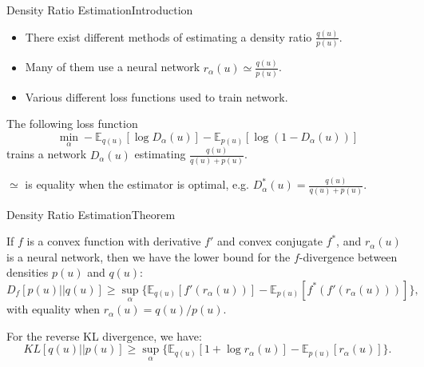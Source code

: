 \documentclass[handout]{beamer}
\newcommand{\E}{\mathbb{E}}
\begin{document}
\begin{frame}{Density Ratio Estimation}{Introduction}
\begin{itemize}
\item There exist different methods of estimating a density ratio $\frac{q(u)}{p(u)}$.
\item Many of them use a neural network $r_\alpha(u)\simeq \frac{q(u)}{p(u)}$.
\vspace{0.1cm}
\item Various different loss functions used to train network.
\end{itemize}
\begin{example}
The following loss function
\[\min_\alpha -\E_{q(u)}[\log D_\alpha(u)]-\E_{p(u)}[\log(1-D_\alpha(u))]\]
trains a network $D_\alpha(u)$ estimating $\frac{q(u)}{q(u)+p(u)}$.
\end{example}
\footnotesize $\simeq$ is equality when the estimator is optimal, e.g. $D^*_\alpha(u)=\frac{q(u)}{q(u)+p(u)}$.
\end{frame}
\begin{frame}{Density Ratio Estimation}{Theorem}
\begin{theorem}
If $f$ is a convex function with derivative $f'$ and convex conjugate $f^*$, and $r_\alpha(u)$ is a neural network, then we have the lower bound for the $f$-divergence between densities $p(u)$ and $q(u)$:
\[D_f [p(u)||q(u)]\geq \sup_{\alpha} \{\mathbb{E}_{q(u)}[f'(r_\alpha(u))]-\mathbb{E}_{p(u)}[f^*(f'(r_\alpha(u)))]\},\]
with equality when $r_\alpha(u)=q(u)/p(u)$.
\end{theorem}
\begin{example}
For the reverse KL divergence, we have:
\[KL[q(u)||p(u)]\geq \sup_{\alpha}\{\mathbb{E}_{q(u)}[1+\log r_\alpha(u)]-\mathbb{E}_{p(u)}[r_\alpha(u)]\}.\]
\end{example}
\end{frame}
\end{document}
